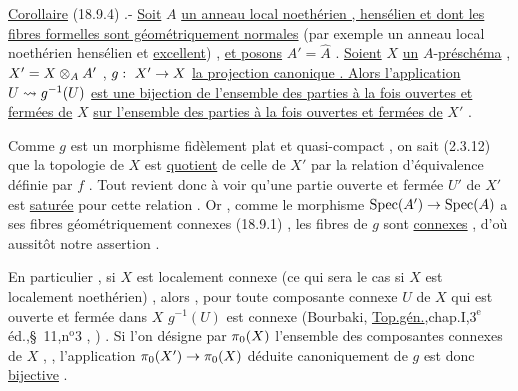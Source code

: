 \uline{Corollaire} (18.9.4) .- \uline{Soit} $A$ \uline{un anneau local noethérien , hensélien et dont les fibres formelles sont géométriquement normales}  (par exemple un anneau local noethérien hensélien et \uline{excellent}) , \uline{et posons} $A'=\hat A$ . \uline{Soient} $X$ \uline{un} $A$-\uline{préschéma} , $X'=X\otimes_A A'$ , $g:\ X'\to X$ \uline{la projection canonique . Alors l'application} $U\rightsquigarrow g^{-1}(U)$ \uline{est une bijection de l'ensemble des parties à la fois ouvertes et fermées de} $X$ \uline{sur l'ensemble des parties à la fois ouvertes et fermées de} $X'$ .

Comme $g$ est un morphisme  fidèlement plat et quasi-compact , on sait (2.3.12) que la topologie de $X$ est \uline{quotient} de celle de $X'$ par la relation d'équivalence définie par $f$ . Tout revient donc à voir  qu'une partie ouverte et fermée $U'$ de $X'$ est \uline{saturée} pour cette relation . Or , comme le morphisme $\operatorname{Spec}(A')\to\operatorname{Spec}(A)$  a ses fibres géométriquement connexes (18.9.1) , les fibres de $g$ sont \uline{connexes} , d'où aussitôt notre assertion .

En particulier , si $X$ est localement connexe (ce qui sera le cas si $X$ est localement noethérien) , alors , pour toute  composante connexe $U$ de $X$ \handwritten{(} qui est ouverte et fermée dans $X$ \handwritten{),} $g^{-1}(U)$ est connexe (Bourbaki, \uline{Top.gén.},chap.I,$3^{\mathrm e}$ éd.,\S\ 11,n$^{\mathrm o}$3 , ) . Si l'on désigne par $\pi_0(X)$ l'ensemble des composantes connexes de $X$ , , l'application $\pi_0(X')\to\pi_0(X)$ déduite canoniquement de $g$ est donc \uline{bijective} .





